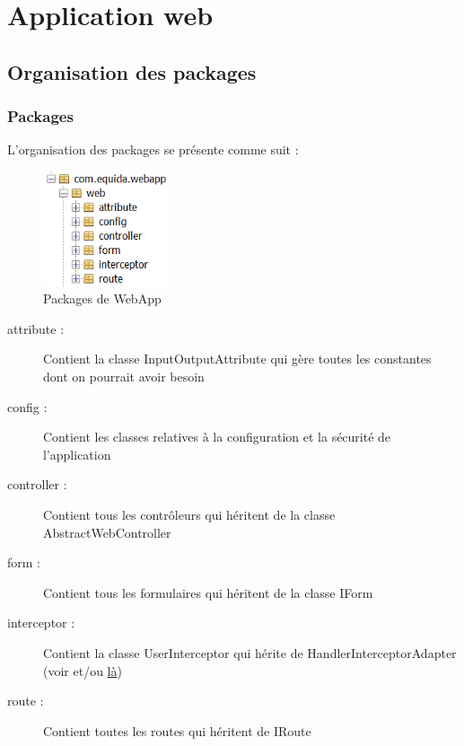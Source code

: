 \chapter{Application web}
\label{chapter:app_web}
	\section{Organisation des packages}

		\subsection{Packages}

			L'organisation des packages se présente comme suit :

			\begin{figure}[H]
				\centering\includegraphics[width=0.33\textwidth, keepaspectratio]{res/webapp-package.png}
				\caption{Packages de WebApp}
			\end{figure}

			\begin{description}
				\item[attribute :]{Contient la classe InputOutputAttribute qui gère toutes les constantes dont on pourrait avoir besoin}
				\item[config :]{Contient les classes relatives à la configuration et la sécurité de l'application}
				\item[controller :]{Contient tous les contrôleurs qui héritent de la classe AbstractWebController}
				\item[form :]{Contient tous les formulaires qui héritent de la classe IForm}
				\item[interceptor :]{Contient la classe UserInterceptor qui hérite de HandlerInterceptorAdapter (voir  et/ou \href{https://www.tutorialspoint.com/spring_boot/spring_boot_interceptor.htm}{là})}
				\item[route :]{Contient toutes les routes qui héritent de IRoute}
			\end{description}

		\newpage
